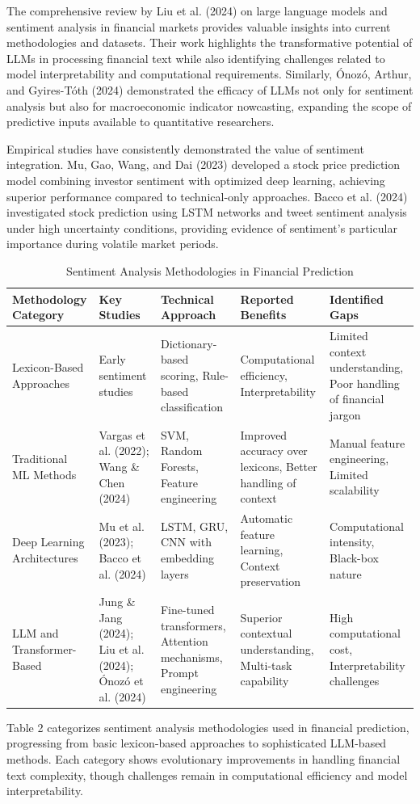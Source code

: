 \documentclass{singlecol-new}
\theoremstyle{TH}{
\newtheorem{lemma}{Lemma}
\newtheorem{theorem}[lemma]{Theorem}
\newtheorem{corrolary}[lemma]{Corrolary}
\newtheorem{conjecture}[lemma]{Conjecture}
\newtheorem{proposition}[lemma]{Proposition}
\newtheorem{claim}[lemma]{Claim}
\newtheorem{stheorem}[lemma]{Wrong Theorem}
\newtheorem{algorithm}{Algorithm}
}
\theoremstyle{THrm}{
\newtheorem{definition}{Definition}[section]
\newtheorem{question}{Question}[section]
\newtheorem{remark}{Remark}
\newtheorem{scheme}{Scheme}
}
\theoremstyle{THhit}{
\newtheorem{case}{Case}[section]
}
\begin{document}
The comprehensive review by Liu et al. (2024) on large language models and sentiment analysis in financial markets provides valuable insights into current methodologies and datasets. Their work highlights the transformative potential of LLMs in processing financial text while also identifying challenges related to model interpretability and computational requirements. Similarly, Ónozó, Arthur, and Gyires-Tóth (2024) demonstrated the efficacy of LLMs not only for sentiment analysis but also for macroeconomic indicator nowcasting, expanding the scope of predictive inputs available to quantitative researchers.

Empirical studies have consistently demonstrated the value of sentiment integration. Mu, Gao, Wang, and Dai (2023) developed a stock price prediction model combining investor sentiment with optimized deep learning, achieving superior performance compared to technical-only approaches. Bacco et al. (2024) investigated stock prediction using LSTM networks and tweet sentiment analysis under high uncertainty conditions, providing evidence of sentiment's particular importance during volatile market periods.


\begin{table}[!ht]
\centering
\caption{Sentiment Analysis Methodologies in Financial Prediction}
\label{tab:sentiment_methodologies}
\small
\begin{tabular}{p{2cm}p{2cm}p{2cm}p{2cm}p{2cm}}
\hline
\textbf{Methodology Category} & \textbf{Key Studies} & \textbf{Technical Approach} & \textbf{Reported Benefits} & \textbf{Identified Gaps} \\
\hline
Lexicon-Based Approaches & Early sentiment studies & Dictionary-based scoring, Rule-based classification & Computational efficiency, Interpretability & Limited context understanding, Poor handling of financial jargon \\
\hline
Traditional ML Methods & Vargas et al. (2022); Wang \& Chen (2024) & SVM, Random Forests, Feature engineering & Improved accuracy over lexicons, Better handling of context & Manual feature engineering, Limited scalability \\
\hline
Deep Learning Architectures & Mu et al. (2023); Bacco et al. (2024) & LSTM, GRU, CNN with embedding layers & Automatic feature learning, Context preservation & Computational intensity, Black-box nature \\
\hline
LLM and Transformer-Based & Jung \& Jang (2024); Liu et al. (2024); Ónozó et al. (2024) & Fine-tuned transformers, Attention mechanisms, Prompt engineering & Superior contextual understanding, Multi-task capability & High computational cost, Interpretability challenges \\
\hline
\end{tabular}
\end{table}
Table 2 categorizes sentiment analysis methodologies used in financial prediction, progressing from basic lexicon-based approaches to sophisticated LLM-based methods. Each category shows evolutionary improvements in handling financial text complexity, though challenges remain in computational efficiency and model interpretability.
\end{document}
